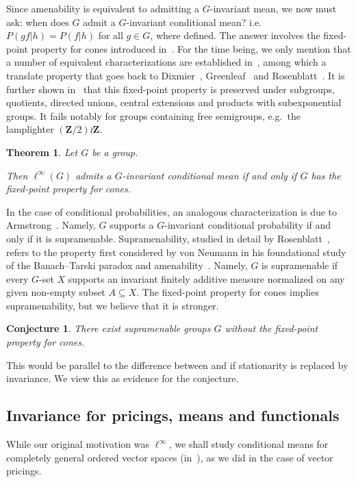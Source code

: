 \documentclass[11pt]{amsart}
\numberwithin{equation}{section}
\newtheorem{ithm}{Theorem}
\newtheorem*{iconj*}{Conjecture}
\theoremstyle{definition}
\theoremstyle{definition}
\newcommand*{\ZZ}{\mathbf{Z}}
\newcommand*{\se}{\subseteq}
\begin{document}
\medskip
Since amenability is equivalent to admitting a $G$-invariant mean, we now must ask: when does $G$ admit a $G$-invariant conditional mean? i.e. $P(g f|h)=P(f|h)$ for all $g\in G$, where defined. The answer involves the fixed-point property for cones introduced in~\cite{Monod_cones}. For the time being, we only mention that a number of equivalent characterizations are established in~\cite{Monod_cones}, among which a translate property that goes back to Dixmier~\cite{Dixmier50}, Greenleaf~\cite{Greenleaf69} and Rosenblatt~\cite{Rosenblatt73}. It is further shown in~\cite{Monod_cones} that this fixed-point property is preserved under subgroups, quotients, directed unions, central extensions and products with subexponential groups. It fails notably for groups containing free semigroups, e.g.\ the lamplighter $(\ZZ/2) \wr \ZZ$.

\begin{ithm}\label{ithm:FPC}
Let $G$ be a group.

\nobreak
Then $\ell^\infty(G)$ admits a $G$-invariant conditional mean if and only if $G$ has the fixed-point property for cones.
\end{ithm}

In the case of conditional probabilities, an analogous characterization is due to Armstrong~\cite{Armstrong89}. Namely, $G$ supports a $G$-invariant conditional probability if and only if it is supramenable. Supramenability, studied in detail by Rosenblatt~\cite{Rosenblatt_PhD}, refers to the property first considered by von Neumann in his foundational study of the Banach--Tarski paradox and amenability~\cite{vonNeumann29}. Namely, $G$ is supramenable if every $G$-set $X$ supports an invariant finitely additive measure normalized on any given non-empty subset $A\se X$. The fixed-point property for cones implies supramenability, but we believe that it is stronger.

\begin{iconj*}
There exist supramenable groups $G$ without the fixed-point property for cones.
\end{iconj*}

This would be parallel to the difference between  and  if stationarity is replaced by invariance. We view this as evidence for the conjecture.

\subsection{Invariance for pricings, means and functionals}%
While our original motivation was $\ell^\infty$, we shall study conditional means for completely general ordered vector spaces (in~), as we did in the case of vector pricings.
\end{document}
